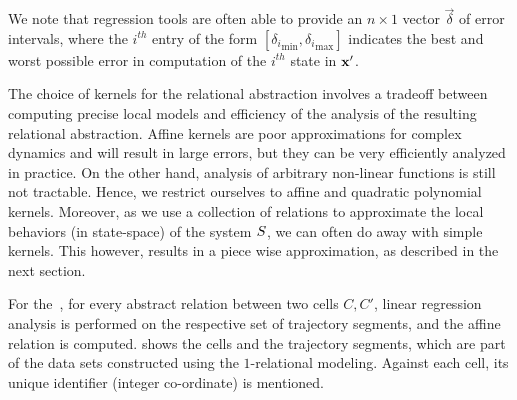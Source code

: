 
We note that regression tools are often able to provide an
$n\times 1$ vector $\vec{\delta}$ of error intervals, where the
$i^{th}$ entry of the form $[{\delta_i}_{\min},{\delta_i}_{\max}]$
indicates the best and worst possible error in computation of the
$i^{th}$ state in $\mathbf{x}'$.

The choice of kernels for the relational abstraction involves a
tradeoff between computing precise local models and efficiency of the
analysis of the resulting relational abstraction. Affine kernels are
poor approximations for complex dynamics and will result in large
errors, but they can be very efficiently analyzed in practice.  On the
other hand, analysis of arbitrary non-linear functions is still not
tractable. Hence, we restrict ourselves to affine and quadratic
polynomial kernels.  Moreover, as we use a collection of relations to
approximate the local behaviors (in state-space) of the system
$S$, we can often do away with simple kernels. This however,
results in a piece wise approximation, as described in the next
section.

\begin{example}
    For the~, for every abstract relation between two cells
    $C, C'$, linear regression analysis is performed on the respective
    set of trajectory segments, and the affine relation is computed.
     shows the cells and the trajectory segments, which
    are part of the data sets constructed using the $1$-relational
    modeling. Against each cell, its unique identifier (integer
    co-ordinate) is mentioned.
\end{example}
